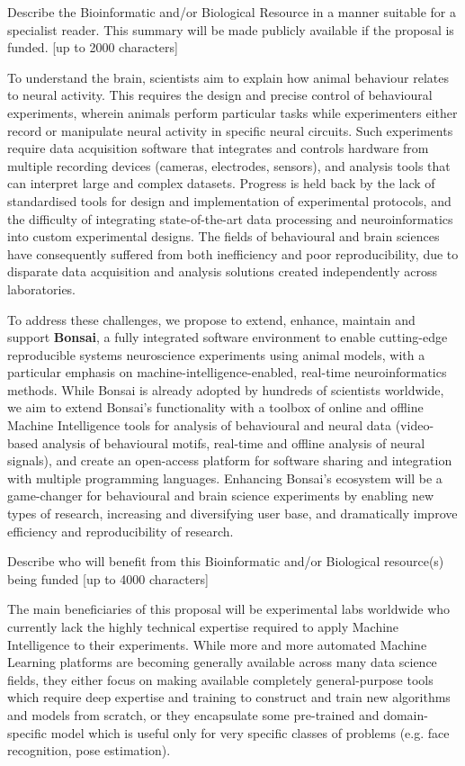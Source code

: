 Describe the Bioinformatic and/or Biological Resource in a manner suitable for a specialist reader. This summary will be made publicly available if the proposal is funded. [up to 2000 characters]

To understand the brain, scientists aim to explain how animal behaviour relates to neural activity. This requires the design and precise control of behavioural experiments, wherein animals perform particular tasks while experimenters either record or manipulate neural activity in specific neural circuits. Such experiments require data acquisition software that integrates and controls hardware from multiple recording devices (cameras, electrodes, sensors), and analysis tools that can interpret large and complex datasets. Progress is held back by the lack of standardised tools for design and implementation of experimental protocols, and the difficulty of integrating state-of-the-art data processing and neuroinformatics into custom experimental designs. The fields of behavioural and brain sciences have consequently suffered from both inefficiency and poor reproducibility, due to disparate data acquisition and analysis solutions created independently across laboratories.   

To address these challenges, we propose to extend, enhance, maintain and support \textbf{Bonsai}, a fully integrated software environment to enable cutting-edge reproducible systems neuroscience experiments using animal models, with a particular emphasis on machine-intelligence-enabled, real-time neuroinformatics methods. While Bonsai is already adopted by hundreds of scientists worldwide, we aim to extend Bonsai’s functionality with a toolbox of online and offline Machine Intelligence tools for analysis of behavioural and neural data (video-based analysis of behavioural motifs, real-time and offline analysis of neural signals), and create an open-access platform for software sharing and integration with multiple programming languages. Enhancing Bonsai's ecosystem will be a game-changer for behavioural and brain science experiments by enabling new types of research, increasing and diversifying user base, and dramatically improve efficiency and reproducibility of research.


Describe who will benefit from this Bioinformatic and/or Biological resource(s) being funded [up to 4000 characters]

The main beneficiaries of this proposal will be experimental labs worldwide who currently lack the highly technical expertise required to apply Machine Intelligence to their experiments. While more and more automated Machine Learning platforms are becoming generally available across many data science fields, they either focus on making available completely general-purpose tools which require deep expertise and training to construct and train new algorithms and models from scratch, or they encapsulate some pre-trained and domain-specific model which is useful only for very specific classes of problems (e.g. face recognition, pose estimation).

